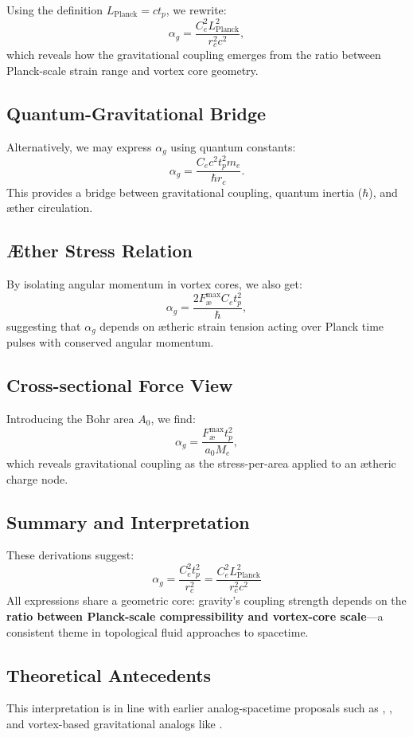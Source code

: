 Using the definition $L_{\text{Planck}} = c t_p$, we rewrite:
\[
    \alpha_g = \frac{C_e^2 L_{\text{Planck}}^2}{r_c^2 c^2},
\]
which reveals how the gravitational coupling emerges from the ratio between Planck-scale strain range and vortex core geometry.

\subsection*{Quantum-Gravitational Bridge}

Alternatively, we may express $\alpha_g$ using quantum constants:
\[
    \alpha_g = \frac{C_e c^2 t_p^2 m_e}{\hbar r_c}.
\]
This provides a bridge between gravitational coupling, quantum inertia ($\hbar$), and æther circulation.

\subsection*{Æther Stress Relation}

By isolating angular momentum in vortex cores, we also get:
\[
    \alpha_g = \frac{2 F^{\text{max}}_{\text{\ae}} C_e t_p^2}{\hbar},
\]
suggesting that $\alpha_g$ depends on ætheric strain tension acting over Planck time pulses with conserved angular momentum.

\subsection*{Cross-sectional Force View}

Introducing the Bohr area $A_0$, we find:
\[
    \alpha_g = \frac{F^{\text{max}}_{\text{\ae}} t_p^2}{a_0 M_e},
\]
which reveals gravitational coupling as the stress-per-area applied to an ætheric charge node.

\subsection*{Summary and Interpretation}

These derivations suggest:
\[
    \boxed{
        \alpha_g = \frac{C_e^2 t_p^2}{r_c^2} = \frac{C_e^2 L_{\text{Planck}}^2}{r_c^2 c^2}
    }
\]
All expressions share a geometric core: gravity's coupling strength depends on the \textbf{ratio between Planck-scale compressibility and vortex-core scale}—a consistent theme in topological fluid approaches to spacetime.

\subsection*{Theoretical Antecedents}

This interpretation is in line with earlier analog-spacetime proposals such as \cite{barcelo2011}, \cite{volovik2003universe}, and vortex-based gravitational analogs like \cite{ranada1989topological}.
